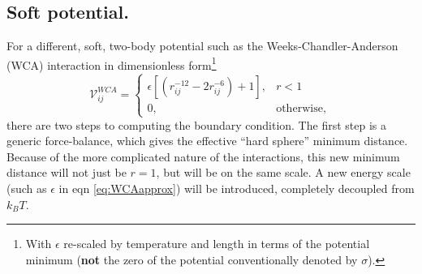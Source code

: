 \documentclass[twocolumn,amsmath,amssymb,aps]{revtex4-1}%
\begin{document}
\subsection{Soft potential.}
For a different, soft, two-body potential such as the Weeks-Chandler-Anderson
(WCA) interaction in dimensionless form\footnote{With $\epsilon$ re-scaled
  by temperature and length in terms of the potential minimum (\textbf{not}
  the zero of the potential conventionally denoted by $\sigma$).}
\begin{equation}\label{eq:WCAapprox}
  \mathcal{V}^{WCA}_{ij} =
  \begin{cases}
    \epsilon[(r_{ij}^{-12}
      -2r_{ij}^{-6})+1],
    & r<1 \\
    0, & \mathrm{otherwise},
  \end{cases}
\end{equation}
there are two steps to computing the boundary condition. The first step is a
generic force-balance, which gives the effective ``hard sphere'' minimum
distance. Because of the more complicated nature of the interactions, this new
minimum distance will not just be $r=1$, but will be on the same scale. A new
energy scale (such as $\epsilon$ in eqn \ref{eq:WCAapprox}) will be introduced,
completely decoupled from $k_BT$.
\end{document}
